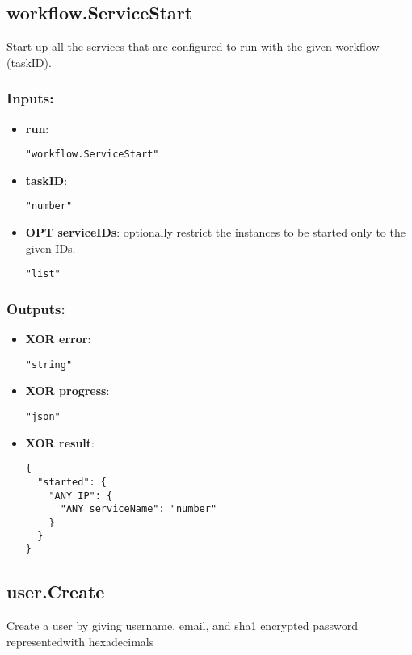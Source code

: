\subsection{workflow.ServiceStart}
Start up all the services that are configured to run with the given workflow (taskID).
\subsubsection*{Inputs:}
\begin{itemize}
    \item \textbf{run}: 
\begin{lstlisting}
"workflow.ServiceStart"
\end{lstlisting}
    \item \textbf{taskID}: 
\begin{lstlisting}
"number"
\end{lstlisting}
    \item \textbf{OPT serviceIDs}: optionally restrict the instances to be started only to the given IDs.
\begin{lstlisting}
"list"
\end{lstlisting}
  \end{itemize}

\subsubsection*{Outputs:}
\begin{itemize}
    \item \textbf{XOR error}: 
\begin{lstlisting}
"string"
\end{lstlisting}
    \item \textbf{XOR progress}: 
\begin{lstlisting}
"json"
\end{lstlisting}
    \item \textbf{XOR result}: 
\begin{lstlisting}
{
  "started": {
    "ANY IP": {
      "ANY serviceName": "number"
    }
  }
}
\end{lstlisting}
  \end{itemize}

\subsection{user.Create}
Create a user by giving username, email, and sha1 encrypted password representedwith hexadecimals
